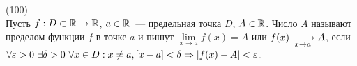 (100)\\
Пусть $f: D \subset \mathbb{R} \to \mathbb{R}$, $a \in \mathbb{R}$~--- предельная точка $D$, $A \in \mathbb{R}$. Число $A$ называют пределом функции $f$ в точке $a$ и пишут $\lim\limits_{x\to a} f(x) = A$ или $f(x) \xrightarrow[x\to a]{} A$, если $\forall\varepsilon > 0\ \exists\delta > 0\ \forall x \in D: x \neq a, [x - a] < \delta \Ra |f(x) - A| < \varepsilon$.